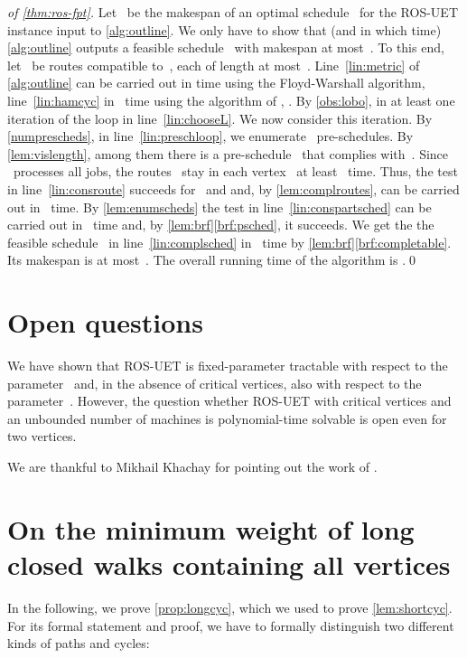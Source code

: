 \documentclass[natbib,sort,smallextended,envcountsame,envcountsect,numbook]{svjour3}
\newcommand{\ROSUPT}{\textsc{ROS-UET}}
\begin{document}
\begin{proof}[of \cref{thm:ros-fpt}]
  Let ~be the makespan of an optimal schedule~
  for the \ROSUPT{} instance input to \cref{alg:outline}.
  We only have to show that (and in which time) \cref{alg:outline} outputs
  a feasible schedule~ with makespan at most~.
  To this end, let ~be routes compatible to~,
  each of length at most~.
  Line~\ref{lin:metric} of \cref{alg:outline}
  can be carried out in  time
  using the Floyd-Warshall algorithm,
  line~\ref{lin:hamcyc} in ~time using
  the algorithm of \citet{Bell62}, \citet{HelK62}.  By
  \cref{obs:lobo},  in at least one iteration of the loop in
  line~\ref{lin:chooseL}.
  We now consider this iteration.
  By \cref{numprescheds},  in line~\ref{lin:preschloop}, we enumerate
  ~pre-schedules.
  By \cref{lem:vislength}, among them there is a pre-schedule~
  that complies with~.
  Since ~processes all jobs, the routes~
  stay in each vertex~ at least ~time.
  Thus, the test in line~\ref{lin:consroute} succeeds for~ and 
  and, by \cref{lem:complroutes}, 
  can be carried out in ~time.
  By \cref{lem:enumscheds} the test in line~\ref{lin:conspartsched}
  can be carried out in ~time
  and, by \cref{lem:brf}\eqref{brf:psched}, it succeeds. We get the
  the feasible schedule~ in line~\ref{lin:complsched}
  in ~time by \cref{lem:brf}\eqref{brf:completable}.
  Its makespan is at most~.
  The overall running time of the algorithm is .\qed
\end{proof}

\section{Open questions}\label{sec:conclusion}
\noindent
We have shown that \ROSUPT{} is fixed-parameter tractable
with respect to the parameter~ and,
in the absence of critical vertices,
also with respect to the parameter~.
However, the question
whether \ROSUPT{} with critical vertices
and an unbounded number of machines
is polynomial-time solvable is open even for two vertices.



\begin{acknowledgements}
  We are thankful 
  to Mikhail Khachay for pointing out the work of \citet{Mad74}.
\end{acknowledgements}




\appendix
\section{On the minimum weight of long closed walks containing all vertices}
\label{appendix}
In the following,
we prove \cref{prop:longcyc},
which we used to prove \cref{lem:shortcyc}.
For its formal statement and proof,
we have to formally distinguish two different kinds of paths and cycles:
\end{document}
